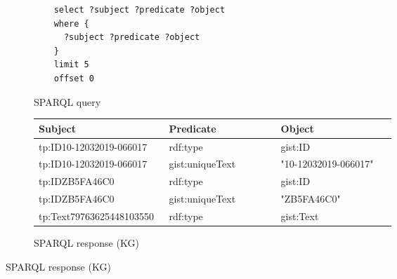 \newpage
\begin{figure}[H]
\centering

\begin{subfigure}{\linewidth}
	\centering

	\begin{lstlisting}
	select ?subject ?predicate ?object
	where {
	  ?subject ?predicate ?object
	}
	limit 5
	offset 0
	\end{lstlisting}

	\caption{SPARQL query}
	\label{fig:tdb_sparql_example}
\end{subfigure}
% 

\begin{subfigure}{\textwidth}
  \centering

  \begin{table}[H]
	  \begin{tabular}{|p{0.35\linewidth}|p{0.30\linewidth}|p{0.31\linewidth}|}
		  \hline
		  \textbf{Subject} & \textbf{Predicate} & \textbf{Object} \\
		  \hline
		  tp:ID10-12032019-066017 & rdf:type & gist:ID \\
		  tp:ID10-12032019-066017 & gist:uniqueText & "10-12032019-066017" \\
		  tp:IDZB5FA46C0 & rdf:type & gist:ID \\
		  tp:IDZB5FA46C0 & gist:uniqueText & "ZB5FA46C0" \\
		  tp:Text79763625448103550 & rdf:type & gist:Text \\
		  \hline
	  \end{tabular}
  \end{table}

  \caption{SPARQL response (KG)}
  \label{fig:tdb_response_example}
\end{subfigure}
\end{figure}

